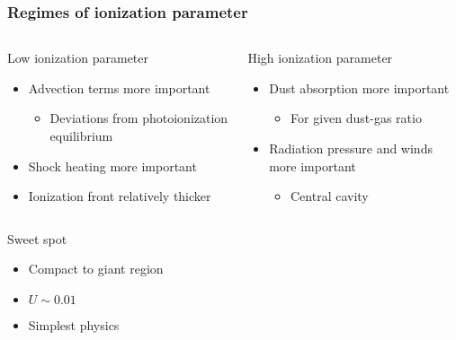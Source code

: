 \documentclass[presentation]{beamer}
\begin{document}
\begin{frame}
  \frametitle{Regimes of ionization parameter}
  
  \begin{columns}
    \begin{block}{Low ionization parameter}
      \begin{itemize}
      \item Advection terms more important
        \begin{itemize}
        \item Deviations from photoionization equilibrium
        \end{itemize}
      \item Shock heating more important
      \item Ionization front relatively thicker
      \end{itemize}
    \end{block}
    \begin{block}{High ionization parameter}
      \begin{itemize}
      \item Dust absorption more important
        \begin{itemize}
        \item For given dust-gas ratio
        \end{itemize}
      \item Radiation pressure and winds more important
        \begin{itemize}
        \item Central cavity
        \end{itemize}
      \end{itemize}
    \end{block}
  \end{columns}

  \bigskip
  \centering
  \begin{minipage}[t]{0.5\linewidth}
    \begin{block}{Sweet spot}
      \begin{itemize}
      \item Compact to giant \hii{} region
      \item \(U \sim 0.01\)
      \item Simplest physics
      \end{itemize}
    \end{block}
  \end{minipage}
\end{frame}
\end{document}
